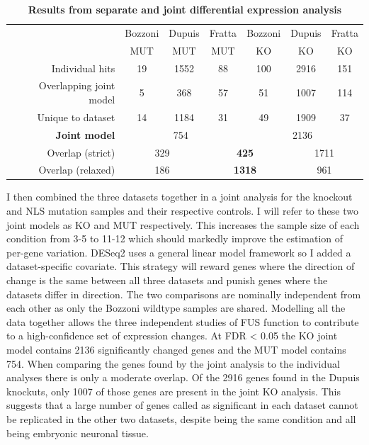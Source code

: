 \begingroup
\renewcommand{\arraystretch}{1.5}
\begin{table}[h!]
	\begin{tabular}{|r|ccc|ccc|}
		\hline
		& Bozzoni & Dupuis & Fratta & Bozzoni & Dupuis & Fratta\\[-0.3cm]
		& MUT & MUT & MUT & KO & KO & KO\\
		\hline
		Individual hits                & 19 & 1552 & 88 & 100 & 2916 & 151 \\
		Overlapping joint model & 5 & 368 & 57 & 51 & 1007 & 114 \\
		Unique to dataset          & 14 & 1184 & 31 & 49 & 1909 & 37 \\
		\hline
		\textbf{Joint model}       & \multicolumn{3}{c|}{754} & \multicolumn{3}{c|}{2136} \\
		\hline
		Overlap (strict)              & \multicolumn{2}{c}{329} & \multicolumn{2}{|c|}{\textbf{425}} & \multicolumn{2}{c|}{1711} \\
		Overlap (relaxed)           & \multicolumn{2}{c}{186} & \multicolumn{2}{|c|}{\textbf{1318} } & \multicolumn{2}{c|}{961} \\
		\hline
	\end{tabular}
	\caption[Results from separate and joint differential expression analysis]{\textbf{Results from separate and joint differential expression analysis}}
	\label{tab:expression_results}
\end{table}
\endgroup


I then combined the three datasets together in a joint analysis for the knockout and NLS mutation samples and their respective controls. 
I will refer to these two joint models as KO and MUT respectively.
This increases the sample size of each condition from 3-5 to 11-12 which should markedly improve the estimation of per-gene variation. 
DESeq2 uses a general linear model framework so I  added a dataset-specific covariate. 
This strategy will reward genes where the direction of change is the same between all three datasets and punish genes where the datasets differ in direction. 
The two comparisons are nominally independent from each other as only the Bozzoni wildtype samples are shared.
Modelling all the data together allows the three independent studies of FUS function to contribute to a high-confidence set of expression changes. 
At FDR < 0.05 the KO joint model contains 2136 significantly changed genes and the MUT model contains 754. 
When comparing the genes found by the joint analysis to the individual analyses there is only a moderate overlap. 
Of the 2916 genes found in the Dupuis knockuts, only 1007 of those genes are present in the joint KO analysis.
This suggests that a large number of genes called as significant in each dataset cannot be replicated in the other two datasets, despite being the same condition and all being embryonic neuronal tissue.

